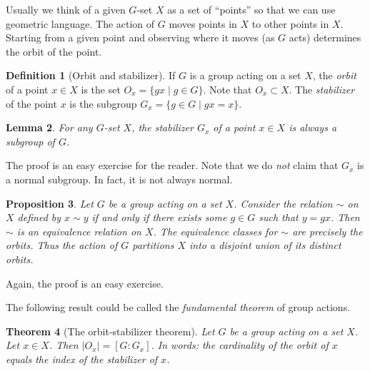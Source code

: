 \documentclass[11pt,oneside]{article}
\newtheorem{thm}{Theorem}[section]
\newtheorem{lem}[thm]{Lemma}
\newtheorem{prop}[thm]{Proposition}
\theoremstyle{definition}
\newtheorem{defn}[thm]{Definition}
\begin{document}
Usually we think of a given $G$-set $X$ as a set of ``points'' so that
we can use geometric language. The action of $G$ moves points in $X$
to other points in $X$. Starting from a given point and observing
where it moves (as $G$ acts) determines the orbit of the point.

\begin{defn}[Orbit and stabilizer]
%
If $G$ is a group acting on a set $X$, the {\em orbit} of a point $x
\in X$ is the set $O_x = \{ gx \mid g\in G \}$.  Note that $O_x
\subset X$.  The {\em stabilizer} of the point $x$ is the subgroup
$G_x = \{g\in G \mid gx =x \}$.
\end{defn}

\begin{lem}\label{lem:stab-is-a-subgp}
  For any $G$-set $X$, the stabilizer $G_x$ of a point $x \in X$ is
  always a subgroup of $G$.
\end{lem}

The proof is an easy exercise for the reader. Note that we do
\emph{not} claim that $G_x$ is a normal subgroup. In fact, it is not
always normal.



\begin{prop} \label{eqrel}  
Let $G$ be a group acting on a set $X$. Consider the relation $\sim$
on $X$ defined by $x \sim y$ if and only if there exists some $g \in
G$ such that $y=gx$. Then $\sim$ is an equivalence relation on
$X$. The equivalence classes for $\sim$ are precisely the orbits. Thus
the action of $G$ partitions $X$ into a disjoint union of its distinct
orbits.
\end{prop}


Again, the proof is an easy exercise.


The following result could be called the \emph{fundamental theorem} of
group actions.

\begin{thm}[The orbit-stabilizer theorem]
\label{osr}%
 Let $G$ be a group acting on a set $X$. Let $x \in X$. Then $|O_x| =
 [G:G_x]$. In words: the cardinality of the orbit of $x$ equals the
 index of the stabilizer of $x$.
\end{thm}
\end{document}
